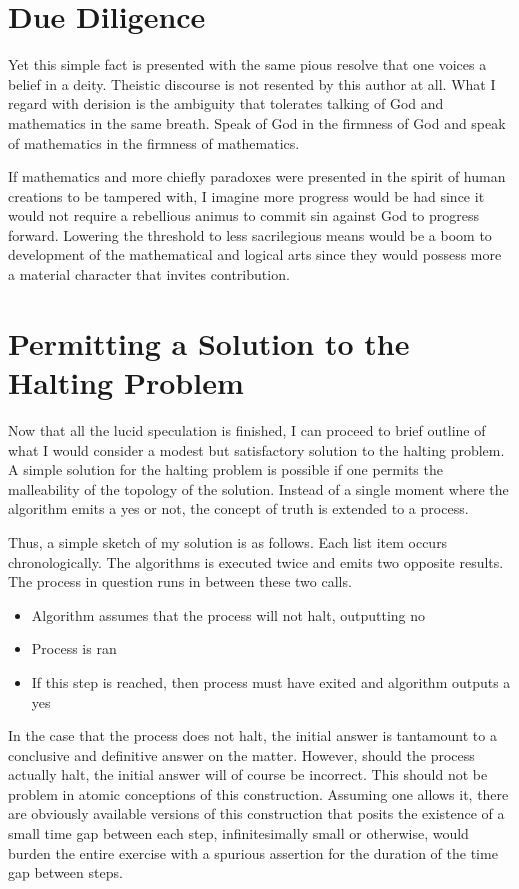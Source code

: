 \documentclass{article}
\begin{document}
	\section{Due Diligence}
	
	Yet this simple fact is presented with the same pious resolve that one voices a belief in a deity. Theistic discourse is not resented by this author at all. What I regard with derision is the ambiguity that tolerates talking of God and mathematics in the same breath. Speak of God in the firmness of God and speak of mathematics in the firmness of mathematics.
	
	If mathematics and more chiefly paradoxes were presented in the spirit of human creations to be tampered with, I imagine more progress would be had since it would not require a rebellious animus to commit sin against God to progress forward. Lowering the threshold to less sacrilegious means would be a boom to development of the mathematical and logical arts since they would possess more a material character that invites contribution.
	
	\section{Permitting a Solution to the Halting Problem}
	
	Now that all the lucid speculation is finished, I can proceed to brief outline of what I would consider a modest but satisfactory solution to the halting problem. A simple solution for the halting problem is possible if one permits the malleability of the topology of the solution. Instead of a single moment where the algorithm emits a yes or not, the concept of truth is extended to a process.
	
	Thus, a simple sketch of my solution is as follows. Each list item occurs chronologically. The algorithms is executed twice and emits two opposite results. The process in question runs in between these two calls.
	\begin{itemize}
		\item Algorithm assumes that the process will not halt, outputting no
		\item Process is ran
		\item If this step is reached, then process must have exited and algorithm outputs a yes
	\end{itemize}

	In the case that the process does not halt, the initial answer is tantamount to a conclusive and definitive answer on the matter. However, should the process actually halt, the initial answer will of course be incorrect. This should not be problem in atomic conceptions of this construction. Assuming one allows it, there are obviously available versions of this construction that posits the existence of a small time gap between each step, infinitesimally small or otherwise, would burden the entire exercise with a spurious assertion for the duration of the time gap between steps.
	
\end{document}
